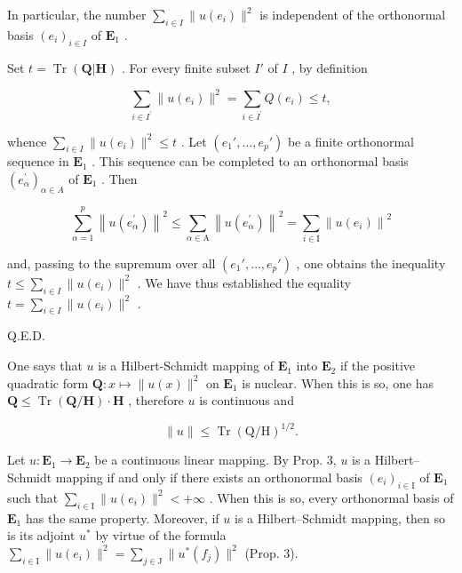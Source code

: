 In particular, the number \(\sum_{i\in I}\| u(e_i)\|^2\) is independent of the orthonormal basis \((e_i)_{i\in I}\) of \(\mathbf{E}_1\) .

Set \(t = \operatorname{Tr}(\mathbf{Q}|\mathbf{H})\) . For every finite subset \(I'\) of \(I\) , by definition

\[
\sum_ {i \in I ^ {\prime}} \| u (e _ {i}) \| ^ {2} = \sum_ {i \in I ^ {\prime}} Q (e _ {i}) \leqslant t,
\]

whence \(\sum_{i\in I}\| u(e_i)\|^2\leqslant t\) . Let \((e_1',\dots ,e_p')\) be a finite orthonormal sequence in \(\mathbf{E}_1\) . This sequence can be completed to an orthonormal basis \((e_{\alpha}^{\prime})_{\alpha \in A}\) of \(\mathbf{E}_1\) . Then

\[
\sum_ {\alpha = 1} ^ {p} \left\| u (e _ {\alpha} ^ {\prime}) \right\| ^ {2} \leqslant \sum_ {\alpha \in \mathrm{A}} \left\| u (e _ {\alpha} ^ {\prime}) \right\| ^ {2} = \sum_ {i \in \mathrm{I}} \left\| u (e _ {i}) \right\| ^ {2}
\]

and, passing to the supremum over all \((e_1', \ldots, e_p')\) , one obtains the inequality \(t \leqslant \sum_{i \in I} \| u(e_i) \|^2\) . We have thus established the equality \(t = \sum_{i \in I} \| u(e_i) \|^2\) .

Q.E.D.

One says that \(u\) is a Hilbert-Schmidt mapping of \(\mathbf{E}_1\) into \(\mathbf{E}_2\) if the positive quadratic form \(\mathbf{Q}: x \mapsto \| u(x) \|^2\) on \(\mathbf{E}_1\) is nuclear. When this is so, one has \(\mathbf{Q} \leqslant \operatorname{Tr}(\mathbf{Q}/\mathbf{H}) \cdot \mathbf{H}\) , therefore \(u\) is continuous and

\[
\| u \| \leqslant \operatorname{Tr} (\mathrm{Q/H}) ^ {1 / 2}.
\]

Let \(u: \mathbf{E}_1 \to \mathbf{E}_2\) be a continuous linear mapping. By Prop. 3, \(u\) is a Hilbert--Schmidt mapping if and only if there exists an orthonormal basis \((e_i)_{i \in \mathrm{I}}\) of \(\mathbf{E}_1\) such that \(\sum_{i \in \mathrm{I}} \|u(e_i)\|^2 < +\infty\) . When this is so, every orthonormal basis of \(\mathbf{E}_1\) has the same property. Moreover, if \(u\) is a Hilbert--Schmidt mapping, then so is its adjoint \(u^*\) by virtue of the formula \(\sum_{i \in \mathrm{I}} \|u(e_i)\|^2 = \sum_{j \in \mathrm{J}} \|u^*(f_j)\|^2\) (Prop. 3).

